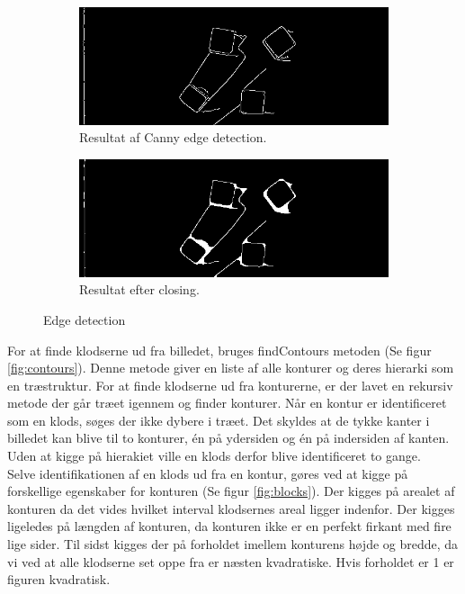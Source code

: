 \begin{figure}[H]
	\centering
	\begin{subfigure}{.45\textwidth}
		\centering
		\includegraphics[scale=0.3]{images/canny}
		\caption{Resultat af Canny edge detection.}
	  	\label{fig:canny}
	\end{subfigure}
	\begin{subfigure}{.45\textwidth}
		\centering
		\includegraphics[scale=0.3]{images/closed}
		\caption{Resultat efter closing.}
		\label{fig:close}
	\end{subfigure}
	\caption{Edge detection}
	\label{fig:edges}
\end{figure}

For at finde klodserne ud fra billedet, bruges findContours metoden (Se figur \ref{fig:contours}). Denne metode giver en liste af alle konturer og deres hierarki som en træstruktur. For at finde klodserne ud fra konturerne, er der lavet en rekursiv metode der går træet igennem og finder konturer. Når en kontur er identificeret som en klods, søges der ikke dybere i træet. Det skyldes at de tykke kanter i billedet kan blive til to konturer, én på ydersiden og én på indersiden af kanten. Uden at kigge på hierakiet ville en klods derfor blive identificeret to gange. \\

Selve identifikationen af en klods ud fra en kontur, gøres ved at kigge på forskellige egenskaber for konturen (Se figur \ref{fig:blocks}). Der kigges på arealet af konturen da det vides hvilket interval klodsernes areal ligger indenfor. Der kigges ligeledes på længden af konturen, da konturen ikke er en perfekt firkant med fire lige sider. Til sidst kigges der på forholdet imellem konturens højde og bredde, da vi ved at alle klodserne set oppe fra er næsten kvadratiske. Hvis forholdet er 1 er figuren kvadratisk. \\

